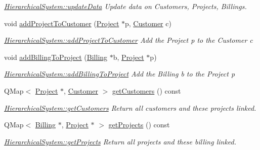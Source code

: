 \begin{DoxyCompactItemize}
\begin{DoxyCompactList}\small\item\em \hyperlink{classUtils_1_1HierarchicalSystem_af0881e95aef001ee46d9f83a9e66dca5}{Hierarchical\-System\-::update\-Data} Update data on Customers, Projects, Billings. \end{DoxyCompactList}\item 
void \hyperlink{classUtils_1_1HierarchicalSystem_a26f07f62ebb50520bc11665e26cedadc}{add\-Project\-To\-Customer} (\hyperlink{classModels_1_1Project}{Project} $\ast$p, \hyperlink{classModels_1_1Customer}{Customer} c)
\begin{DoxyCompactList}\small\item\em \hyperlink{classUtils_1_1HierarchicalSystem_a26f07f62ebb50520bc11665e26cedadc}{Hierarchical\-System\-::add\-Project\-To\-Customer} Add the Project {\itshape p} to the Customer {\itshape c} \end{DoxyCompactList}\item 
void \hyperlink{classUtils_1_1HierarchicalSystem_a4452533b6f536a92ba1a3c5fe3d8c12d}{add\-Billing\-To\-Project} (\hyperlink{classModels_1_1Billing}{Billing} $\ast$b, \hyperlink{classModels_1_1Project}{Project} $\ast$p)
\begin{DoxyCompactList}\small\item\em \hyperlink{classUtils_1_1HierarchicalSystem_a4452533b6f536a92ba1a3c5fe3d8c12d}{Hierarchical\-System\-::add\-Billing\-To\-Project} Add the Billing {\itshape b} to the Project p \end{DoxyCompactList}\item 
Q\-Map$<$ \hyperlink{classModels_1_1Project}{Project} $\ast$, \hyperlink{classModels_1_1Customer}{Customer} $>$ \hyperlink{classUtils_1_1HierarchicalSystem_aa66210b1d52960ebc9b7b1d827de8564}{get\-Customers} () const 
\begin{DoxyCompactList}\small\item\em \hyperlink{classUtils_1_1HierarchicalSystem_aa66210b1d52960ebc9b7b1d827de8564}{Hierarchical\-System\-::get\-Customers} Return all customers and these projects linked. \end{DoxyCompactList}\item 
Q\-Map$<$ \hyperlink{classModels_1_1Billing}{Billing} $\ast$, \hyperlink{classModels_1_1Project}{Project} $\ast$ $>$ \hyperlink{classUtils_1_1HierarchicalSystem_ae62e86244c20f66c4b741ad3a235e7d1}{get\-Projects} () const 
\begin{DoxyCompactList}\small\item\em \hyperlink{classUtils_1_1HierarchicalSystem_ae62e86244c20f66c4b741ad3a235e7d1}{Hierarchical\-System\-::get\-Projects} Return all projects and these billing linked. \end{DoxyCompactList}\end{DoxyCompactItemize}


